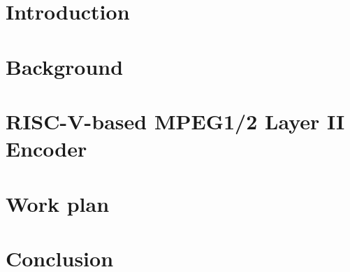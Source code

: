 \documentclass[10pt]{esda}
\begin{document}
\cleardoublepage
\tableofcontents
\listoftables
\listoffigures

\cleardoublepage


\cleardoublepage
\section{Introduction}
\label{sec:intro}


\cleardoublepage
\section{Background}
\label{sec:back}


\cleardoublepage
\section{RISC-V-based MPEG1/2 Layer II Encoder}
\label{sec:curr}


\cleardoublepage
\section{Work plan}
\label{sec:plan}


\cleardoublepage
\section{Conclusion}
\label{sec:conc}


\cleardoublepage
{}


\end{document}
